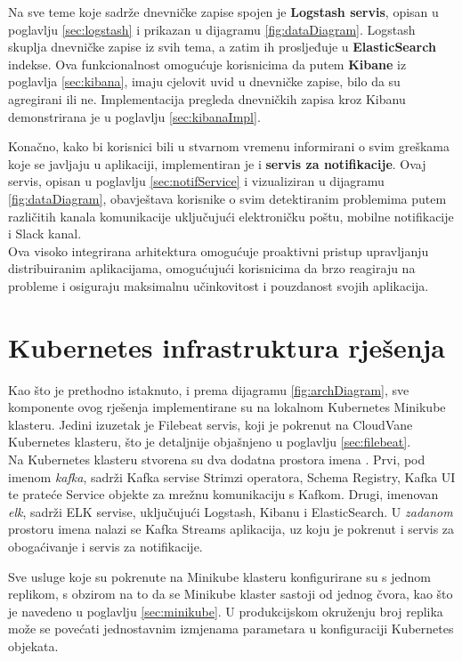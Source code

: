 \documentclass[times, utf8, diplomski]{fer}
\begin{document}
Na sve teme koje sadrže dnevničke zapise spojen je \textbf{Logstash servis}, opisan u poglavlju \ref{sec:logstash} i prikazan u dijagramu \ref{fig:dataDiagram}. Logstash skuplja dnevničke zapise iz svih tema, a zatim ih prosljeđuje u \textbf{ElasticSearch} indekse. Ova funkcionalnost omogućuje korisnicima da putem \textbf{Kibane} iz poglavlja \ref{sec:kibana}, imaju cjelovit uvid u dnevničke zapise, bilo da su agregirani ili ne. Implementacija pregleda dnevničkih zapisa kroz Kibanu demonstrirana je u poglavlju \ref{sec:kibanaImpl}.

Konačno, kako bi korisnici bili u stvarnom vremenu informirani o svim greškama koje se javljaju u aplikaciji, implementiran je i \textbf{servis za notifikacije}. Ovaj servis, opisan u poglavlju \ref{sec:notifService} i vizualiziran u dijagramu \ref{fig:dataDiagram}, obavještava korisnike o svim detektiranim problemima putem različitih kanala komunikacije uključujući elektroničku poštu, mobilne notifikacije i Slack kanal.\\

Ova visoko integrirana arhitektura omogućuje proaktivni pristup upravljanju distribuiranim aplikacijama, omogućujući korisnicima da brzo reagiraju na probleme i osiguraju maksimalnu učinkovitost i pouzdanost svojih aplikacija.


\section{Kubernetes infrastruktura rješenja}
\label{sec:localKubernetes}

Kao što je prethodno istaknuto, i prema dijagramu \ref{fig:archDiagram}, sve komponente ovog rješenja implementirane su na lokalnom Kubernetes Minikube klasteru. Jedini izuzetak je Filebeat servis, koji je pokrenut na CloudVane Kubernetes klasteru, što je detaljnije objašnjeno u poglavlju \ref{sec:filebeat}.\\

Na Kubernetes klasteru stvorena su dva dodatna prostora imena . Prvi, pod imenom \emph{\glqq kafka\grqq}, sadrži Kafka servise Strimzi operatora, Schema Registry, Kafka UI te prateće Service objekte za mrežnu komunikaciju s Kafkom. Drugi, imenovan \emph{\glqq elk\grqq}, sadrži ELK servise, uključujući Logstash, Kibanu i ElasticSearch. U \emph{zadanom}  prostoru imena nalazi se Kafka Streams aplikacija, uz koju je pokrenut i servis za obogaćivanje i servis za notifikacije.

Sve usluge koje su pokrenute na Minikube klasteru konfigurirane su s jednom replikom, s obzirom na to da se Minikube klaster sastoji od jednog čvora, kao što je navedeno u poglavlju \ref{sec:minikube}. U produkcijskom okruženju broj replika može se povećati jednostavnim izmjenama parametara u konfiguraciji Kubernetes objekata.\\
\end{document}
